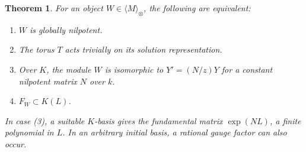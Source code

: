 \documentclass[11pt,a4paper]{article}
\newtheorem{theorem}{Theorem}[section]
\theoremstyle{definition}
\theoremstyle{remark}
\numberwithin{equation}{section}
\begin{document}
\begin{theorem}\label{at:ten:classification}
For an object $W\in\langle M\rangle_\otimes$, the following are
equivalent:
\begin{enumerate}
 \item $W$ is globally nilpotent.
 \item The torus $T$ acts trivially on its solution representation.
 \item Over $K$, the module $W$ is isomorphic to
       $Y'=(N/z)Y$ for a constant nilpotent matrix $N$ over $k$.
 \item $F_W\subset K(L)$.
\end{enumerate}
In case (3), a suitable $K$-basis gives the fundamental matrix
$\exp(NL)$, a finite polynomial in $L$.  In an arbitrary initial
basis, a rational gauge factor can also occur.
\end{theorem}
\end{document}
